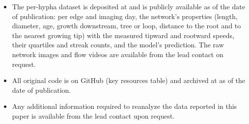 \begin{itemize}
  \item The per-hypha dataset is deposited at  and is publicly available as of the date of publication: per edge and imaging day, the network's properties (length, diameter, age, growth downstream, tree or loop, distance to the root and to the nearest growing tip) with the measured tipward and rootward speeds, their quartiles and streak counts, and the model's prediction.
The raw network images and flow videos are available from the lead contact on request.
  \item All original code is on GitHub (key resources table) and archived at  as of the date of publication.
  \item Any additional information required to reanalyze the data reported in this paper is available from the lead contact upon request.
\end{itemize}


